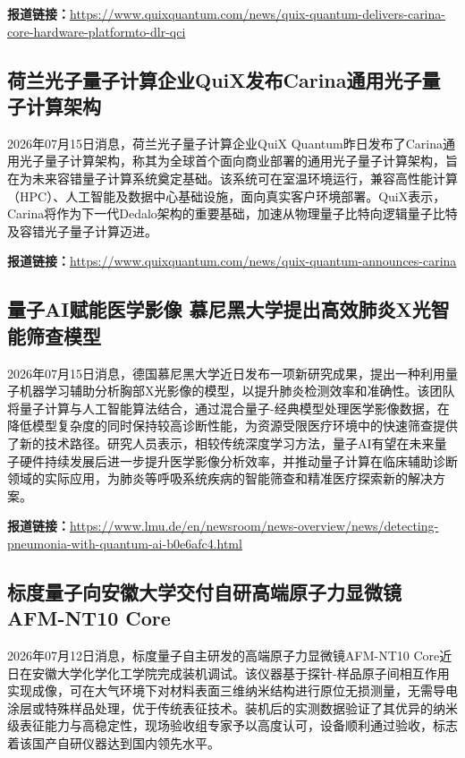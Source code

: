 \documentclass[12pt,a4paper]{ctexart}
\begin{document}
\noindent\textbf{报道链接：}\url{https://www.quixquantum.com/news/quix-quantum-delivers-carina-core-hardware-platformto-dlr-qci}

\subsection{ 荷兰光子量子计算企业QuiX发布Carina通用光子量子计算架构 }

2026年07月15日消息，荷兰光子量子计算企业QuiX Quantum昨日发布了Carina通用光子量子计算架构，称其为全球首个面向商业部署的通用光子量子计算架构，旨在为未来容错量子计算系统奠定基础。该系统可在室温环境运行，兼容高性能计算（HPC）、人工智能及数据中心基础设施，面向真实客户环境部署。QuiX表示，Carina将作为下一代Dedalo架构的重要基础，加速从物理量子比特向逻辑量子比特及容错光子量子计算迈进。

\noindent\textbf{报道链接：}\url{https://www.quixquantum.com/news/quix-quantum-announces-carina}

\subsection{ 量子AI赋能医学影像 慕尼黑大学提出高效肺炎X光智能筛查模型 }

2026年07月15日消息，德国慕尼黑大学近日发布一项新研究成果，提出一种利用量子机器学习辅助分析胸部X光影像的模型，以提升肺炎检测效率和准确性。该团队将量子计算与人工智能算法结合，通过混合量子-经典模型处理医学影像数据，在降低模型复杂度的同时保持较高诊断性能，为资源受限医疗环境中的快速筛查提供了新的技术路径。研究人员表示，相较传统深度学习方法，量子AI有望在未来量子硬件持续发展后进一步提升医学影像分析效率，并推动量子计算在临床辅助诊断领域的实际应用，为肺炎等呼吸系统疾病的智能筛查和精准医疗探索新的解决方案。

\noindent\textbf{报道链接：}\url{https://www.lmu.de/en/newsroom/news-overview/news/detecting-pneumonia-with-quantum-ai-b0e6afc4.html}

\subsection{ 标度量子向安徽大学交付自研高端原子力显微镜AFM-NT10 Core }

2026年07月12日消息，标度量子自主研发的高端原子力显微镜AFM-NT10 Core近日在安徽大学化学化工学院完成装机调试。该仪器基于探针-样品原子间相互作用实现成像，可在大气环境下对材料表面三维纳米结构进行原位无损测量，无需导电涂层或特殊样品处理，优于传统表征技术。装机后的实测数据验证了其优异的纳米级表征能力与高稳定性，现场验收组专家予以高度认可，设备顺利通过验收，标志着该国产自研仪器达到国内领先水平。
\end{document}
